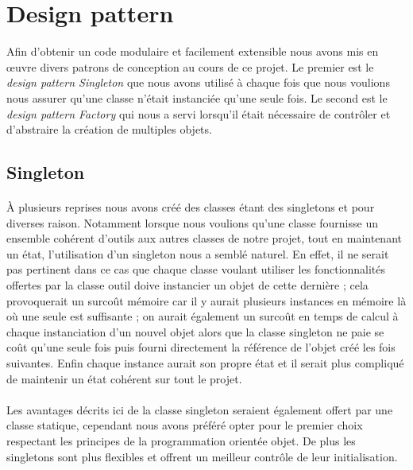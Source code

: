 \section{Design pattern}

Afin d'obtenir un code modulaire et facilement extensible nous avons mis en
œuvre divers patrons de conception au cours de ce projet. Le premier est le
\emph{design pattern Singleton} que nous avons utilisé à chaque fois que nous
voulions nous assurer qu'une classe n'était instanciée qu'une seule fois. Le
second est le \emph{design pattern Factory} qui nous a servi lorsqu'il était
nécessaire de contrôler et d'abstraire la création de multiples objets.

\subsection{Singleton}

\paragraph{}
À plusieurs reprises nous avons créé des classes étant des singletons et pour
diverses raison. Notamment lorsque nous voulions qu'une classe fournisse un
ensemble cohérent d'outils aux autres classes de notre projet, tout en
maintenant un état, l'utilisation d'un singleton nous a semblé naturel. En
effet, il ne serait pas pertinent dans ce cas que chaque classe voulant
utiliser les fonctionnalités offertes par la classe outil doive instancier un
objet de cette dernière ; cela provoquerait un surcoût mémoire car il y aurait
plusieurs instances en mémoire là où une seule est suffisante ; on aurait
également un surcoût en temps de calcul à chaque instanciation d'un nouvel
objet alors que la classe singleton ne paie se coût qu'une seule fois puis
fourni directement la référence de l'objet créé les fois suivantes. Enfin
chaque instance aurait son propre état et il serait plus compliqué de
maintenir un état cohérent sur tout le projet.

\paragraph{}
Les avantages décrits ici de la classe singleton seraient également offert par
une classe statique, cependant nous avons préféré opter pour le premier choix
respectant les principes de la programmation orientée objet. De plus les
singletons sont plus flexibles et offrent un meilleur contrôle de leur
initialisation.

